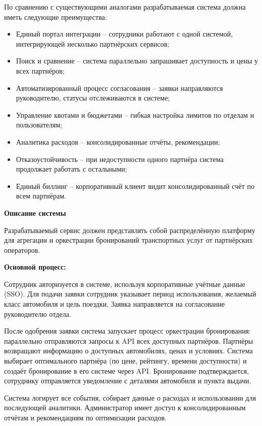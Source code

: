 \documentclass{bmstu}
\begin{document}
По сравнению с существующими аналогами разрабатываемая система должна иметь следующие преимущества:

\begin{itemize}
    \item Единый портал интеграции -- сотрудники работают с одной системой, интегрирующей несколько партнёрских сервисов;
    \item Поиск и сравнение -- система параллельно запрашивает доступность и цены у всех партнёров;
    \item Автоматизированный процесс согласования -- заявки направляются руководителю, статусы отслеживаются в системе;
    \item Управление квотами и бюджетами -- гибкая настройка лимитов по отделам и пользователям;
    \item Аналитика расходов -- консолидированные отчёты, рекомендации;
    \item Отказоустойчивость -- при недоступности одного партнёра система продолжает работать с остальными;
    \item Единый биллинг -- корпоративный клиент видит консолидированный счёт по всем партнёрам.
\end{itemize}

\begin{center}
    \textbf{Описание системы}
\end{center}

Разрабатываемый сервис должен представлять собой распределённую платформу для агрегации и оркестрации бронирований транспортных услуг от партнёрских операторов.

\textbf{Основной процесс:}

Сотрудник авторизуется в системе, используя корпоративные учётные данные (SSO). Для подачи заявки сотрудник указывает период использования, желаемый класс автомобиля и цель поездки. Заявка направляется на согласование руководителю отдела.

После одобрения заявки система запускает процесс оркестрации бронирования: параллельно отправляются запросы к API всех доступных партнёров. Партнёры возвращают информацию о доступных автомобилях, ценах и условиях. Система выбирает оптимального партнёра (по цене, рейтингу, времени доступности) и создаёт бронирование в его системе через API. Бронирование подтверждается, сотруднику отправляется уведомление с деталями автомобиля и пункта выдачи.

Система логирует все события, собирает данные о расходах и использовании для последующей аналитики. Администратор имеет доступ к консолидированным отчётам и рекомендациям по оптимизации расходов.
\end{document}
